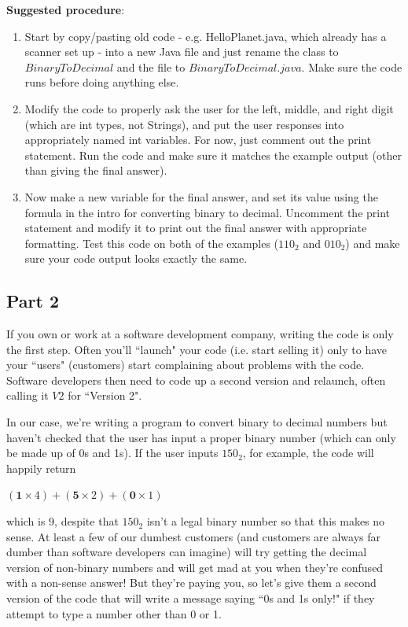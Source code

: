 \documentclass[answers,addpoints]{exam} %
\begin{document}
\begin{questions}
\textbf{Suggested procedure}:

\begin{enumerate}

\item Start by copy/pasting old code - e.g. HelloPlanet.java, which already has a scanner set up - into a new Java file and just rename the class to $BinaryToDecimal$ and the file to $BinaryToDecimal.java$. Make sure the code runs before doing anything else. 

\item Modify the code to properly ask the user for the left, middle, and right digit (which are int types, not Strings), and put the user responses into appropriately named int variables. For now, just comment out the print statement. Run the code and make sure it matches the example output (other than giving the final answer). 

\item Now make a new variable for the final answer, and set its value using the formula in the intro for converting binary to decimal. Uncomment the print statement and modify it to print out the final answer with appropriate formatting. Test this code on both of the examples ($110_2$ and $010_2$) and make sure your code output looks exactly the same.

\end{enumerate}

\subsection{Part 2}

If you own or work at a software development company, writing the code is only the first step. Often you'll ``launch" your code (i.e. start selling it) only to have your ``users" (customers) start complaining about problems with the code. Software developers then need to code up a second version and relaunch, often calling it $V2$ for ``Version 2". 

In our case, we're writing a program to convert binary to decimal numbers but haven't checked that the user has input a proper binary number (which can only be made up of 0s and 1s). If the user inputs $150_2$, for example, the code will happily return 

$(\mathbf{1} \times 4) + (\mathbf{5} \times 2) + (\mathbf{0} \times 1)$

which is 9, despite that $150_2$ isn't a legal binary number so that this makes no sense. At least a few of our dumbest customers (and customers are always far dumber than software developers can imagine) will try getting the decimal version of non-binary numbers and will get mad at you when they're confused with a non-sense answer! But they're paying you, so let's give them a second version of the code that will write a message saying ``0s and 1s only!" if they attempt to type a number other than 0 or 1.


\end{questions}
\end{document}
